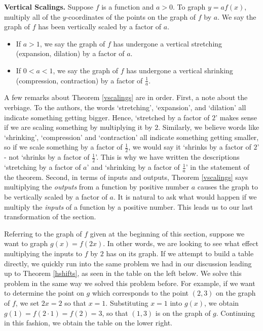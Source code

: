 \colorbox{ResultColor}{\bbm


\begin{thm} \label{vscalings}\textbf{Vertical Scalings.}  Suppose $f$ is a function and $a>0$.  To graph $y=a f(x)$, multiply all of the $y$-coordinates of the points on the graph of $f$ by $a$.  We say the graph of $f$ has been vertically scaled by a factor of $a$. 

\begin{itemize}

\item If $a > 1$, we say the graph of $f$ has undergone a vertical stretching (expansion, dilation) by a factor of $a$. 

\item If $0 < a < 1$, we say the graph of $f$ has undergone a vertical shrinking (compression, contraction) by a factor of $\frac{1}{a}$.

\end{itemize}

\end{thm}

\ebm}

\pagebreak

A few remarks about Theorem \ref{vscalings} are in order.  First, a note about the verbiage.  To the authors, the words `stretching', `expansion', and `dilation' all indicate something getting bigger.  Hence, `stretched by a factor of $2$' makes sense if we are scaling something by multiplying it by $2$.  Similarly, we believe words like `shrinking', `compression' and `contraction' all indicate something getting smaller, so if we scale something by a factor of $\frac{1}{2}$, we would say it `shrinks by a factor of $2$' - not `shrinks by a factor of $\frac{1}{2}$'.  This is why we have written the descriptions `stretching by a factor of $a$' and `shrinking by a factor of $\frac{1}{a}$' in the statement of the theorem.  Second, in terms of inputs and outputs, Theorem \ref{vscalings} says multiplying the \textit{outputs} from a function by positive number $a$ causes the graph to be vertically scaled by a factor of $a$.  It is natural to ask what would happen if we multiply the \textit{inputs} of a function by a positive number.  This leads us to our last transformation of the section.

\smallskip

Referring to the graph of $f$ given at the beginning of this section, suppose we want to graph $g(x) = f(2x)$.  In other words, we are looking to see what effect multiplying the inputs to $f$ by $2$ has on its graph.  If we attempt to build a table directly, we quickly run into the same problem we had in our discussion leading up to Theorem \ref{hshifts}, as seen in the table on the left below.  We solve this problem in the same way we solved this problem before.  For example, if we want to determine the point on $g$ which corresponds to the point $(2,3)$ on the graph of $f$,  we set $2x =2 $ so that $x=1$.  Substituting $x=1$ into $g(x)$, we obtain $g(1) = f(2 \cdot 1) = f(2) = 3$, so that $(1,3)$ is on the graph of $g$. Continuing in this fashion, we obtain the table on the lower right.   

